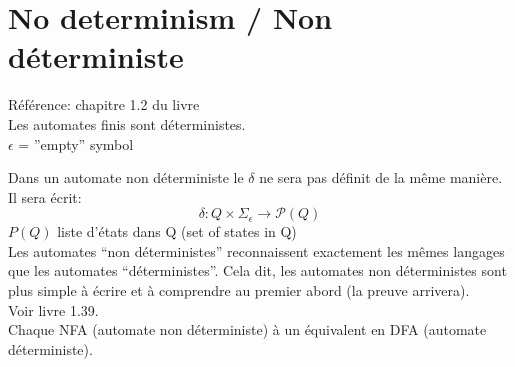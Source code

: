 \documentclass[a4paper,12pt]{article}
\begin{document}
\section{No determinism / Non déterministe}
  Référence: chapitre 1.2 du livre\\
  Les automates finis sont déterministes.\\
  $\epsilon$ = ''empty'' symbol
  
  \begin{figure}[h!]
    \centering
  \end{figure}
  
  Dans un automate non déterministe le $\delta$ ne sera pas définit de la même manière.  Il sera écrit:
  $$\delta : Q \times \Sigma_{\epsilon} \rightarrow \mathcal P(Q)$$
  $P(Q)$ liste d'états dans Q (set of states in Q)\\
  Les automates ``non déterministes'' reconnaissent exactement les mêmes langages que les automates ``déterministes''.  Cela dit, les automates non déterministes sont plus simple à écrire et à comprendre au premier abord (la preuve arrivera).\\
  Voir livre 1.39.\\
  Chaque NFA (automate non déterministe) à un équivalent en DFA (automate déterministe).
\end{document}
